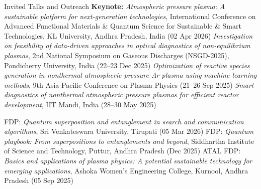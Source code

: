 \begin{rubric}{Invited Talks and Outreach}
\entry*[Apr 2026]%
  \textbf{Keynote:} \emph{Atmospheric pressure plasma: A sustainable platform for next-generation technologies}, International Conference on Advanced Functional Materials \& Quantum Science for Sustainable \& Smart Technologies, KL University, Andhra Pradesh, India (02 Apr 2026)
\entry*[Dec 2025]%
  \emph{Investigation on feasibility of data-driven approaches in optical diagnostics of non-equilibrium plasmas}, 2nd National Symposium on Gaseous Discharges (NSGD-2025), Pondicherry University, India (22--23 Dec 2025)
\entry*[Sep 2025]%
  \emph{Optimization of reactive species generation in nonthermal atmospheric pressure Ar plasma using machine learning methods}, 9th Asia-Pacific Conference on Plasma Physics (21--26 Sep 2025)
\entry*[May 2025]%
  \emph{Smart diagnostics of nonthermal atmospheric pressure plasmas for efficient reactor development}, IIT Mandi, India (28--30 May 2025)

\entry*[Mar 2026]%
  FDP: \emph{Quantum superposition and entanglement in search and communication algorithms}, Sri Venkateswara University, Tirupati (05 Mar 2026)
\entry*[Dec 2025]%
  FDP: \emph{Quantum playbook: From superpositions to entanglements and beyond}, Siddhartha Institute of Science and Technology, Puttur, Andhra Pradesh (Dec 2025)
\entry*[Sep 2025]%
  ATAL FDP: \emph{Basics and applications of plasma physics: A potential sustainable technology for emerging applications}, Ashoka Women's Engineering College, Kurnool, Andhra Pradesh (05 Sep 2025)
\end{rubric}
